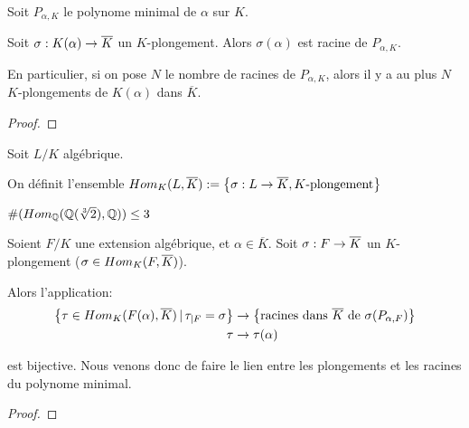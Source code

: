 \begin{proposition}
	Soit $P_{\alpha, K}$ le polynome minimal de $\alpha$ sur $K$.

	Soit $\sigma : K(\alpha) \rightarrow \overline{K}$ un $K$-plongement. Alors
	$\sigma(\alpha)$ est racine de $P_{\alpha, K}$.

	En particulier, si on pose $N$ le nombre de racines de $P_{\alpha, K}$,
	alors il y a au plus $N$ $K$-plongements de $K(\alpha)$ dans $\overline{K}$.
\end{proposition}

\ifdefined\outputproof
\begin{proof}

\end{proof}
\fi

\begin{definition}
	Soit $L/K$ algébrique.

	On définit l'ensemble $Hom_{K}(L, \overline{K}) :=
	\left\{ \sigma : L \rightarrow \overline{K}, \text{$K$-plongement} \right\}$
\end{definition}

\begin{exemple}
	$\#(Hom_{\mathbb{Q}}(\mathbb{Q}(\sqrt[3]{2}), \mathbb{Q})) \leq 3$
\end{exemple}


\begin{proposition}
	Soient $F/K$ une extension algébrique, et $\alpha \in \overline{K}$.
	Soit $\sigma : F \rightarrow \overline{K}$ un $K$-plongement ($\sigma \in
	Hom_{K}(F, \overline{K})$).

	Alors l'application:
	\begin{align*}
		\left\{\tau \in Hom_{K}(F(\alpha), \overline{K}) \, | \, \tau_{|F} =
	\sigma \right\} &\rightarrow \left\{  \text{racines dans } \overline{K} \text{ de }
		\sigma(P_{\alpha, F}) \right\} \\
		\tau &\rightarrow \tau(\alpha)
	\end{align*}

	est bijective. Nous venons donc de faire le lien entre les plongements et
	les racines du polynome minimal.
\end{proposition}

\ifdefined\outputproof
\begin{proof}

\end{proof}
\fi

